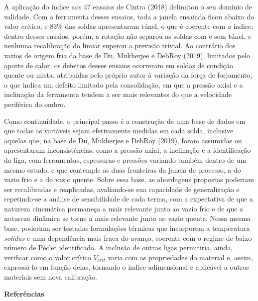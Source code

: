 \documentclass[12pt,openany]{report}
\begin{document}
A aplicação do índice aos 47 ensaios de Cintra (2018) delimitou o seu domínio de validade. Com a ferramenta desses ensaios, toda a janela ensaiada ficou abaixo do valor crítico, e 83\% das soldas apresentaram túnel, o que é coerente com o índice; dentro desses ensaios, porém, a rotação não separou as soldas com e sem túnel, e nenhuma recalibração do limiar superou a previsão trivial. Ao contrário dos vazios de origem fria da base de Du, Mukherjee e DebRoy (2019), limitados pelo aporte de calor, os defeitos desses ensaios ocorreram em soldas de condição quente ou mista, atribuídas pelo próprio autor à variação da força de forjamento, o que indica um defeito limitado pela consolidação, em que a pressão axial e a inclinação da ferramenta tendem a ser mais relevantes do que a velocidade periférica do ombro.

Como continuidade, o principal passo é a construção de uma base de dados em que todas as variáveis sejam efetivamente medidas em cada solda, inclusive aquelas que, na base de Du, Mukherjee e DebRoy (2019), foram assumidas ou apresentaram inconsistências, como a pressão axial, a inclinação e a identificação da liga, com ferramentas, espessuras e pressões variando também dentro de um mesmo estudo, e que contemple as duas fronteiras da janela de processo, a do vazio frio e a do vazio quente. Sobre essa base, as abordagens propostas poderiam ser recalibradas e reaplicadas, avaliando-se sua capacidade de generalização e repetindo-se a análise de sensibilidade de cada termo, com a expectativa de que a natureza cinemática permaneça a mais relevante junto ao vazio frio e de que a natureza dinâmica se torne a mais relevante junto ao vazio quente. Nessa mesma base, poderiam ser testadas formulações térmicas que incorporem a temperatura \textit{solidus} e uma dependência mais fraca do avanço, coerente com o regime de baixo número de Péclet identificado. A inclusão de outras ligas permitiria, ainda, verificar como o valor crítico $V_{crit}$ varia com as propriedades do material e, assim, expressá-lo em função delas, tornando o índice adimensional e aplicável a outros materiais sem nova calibração.

\newpage

\begin{center}
    {\fontsize{18}{22}\selectfont\bfseries Referências\par}
\end{center}
\vspace{0.5cm}
\end{document}
